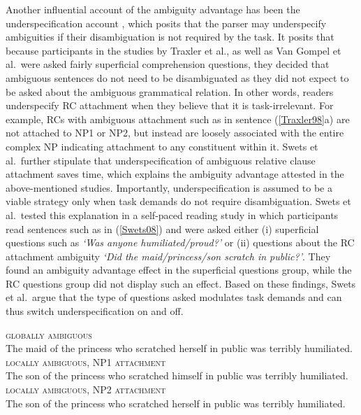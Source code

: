 \documentclass[english, doc]{apa7}\usepackage[]{graphicx}\usepackage[]{color}
\begin{document}
Another influential account of the ambiguity advantage has been the underspecification account \citep{SwetsEtAl:2008}, which posits that the parser may underspecify ambiguities if their disambiguation is not required by the task. It posits that because participants in the studies by Traxler et al., as well as Van Gompel et al.~were asked fairly superficial comprehension questions, they decided that ambiguous sentences do not need to be disambiguated as they did not expect to be asked about the ambiguous grammatical relation. In other words, readers underspecify RC attachment when they believe that it is task-irrelevant. For example, RCs with ambiguous attachment such as in sentence (\ref{Traxler98}a) are not attached to NP1 or NP2, but instead are loosely associated with the entire complex NP indicating attachment to any constituent within it.
Swets et al.~further stipulate that underspecification of ambiguous relative clause attachment saves time, which explains the ambiguity advantage attested in the above-mentioned studies. Importantly, underspecification is assumed to be a viable strategy only when task demands do not require disambiguation. Swets et al.~tested this explanation in a self-paced reading study in which participants read sentences such as in (\ref{Swets08}) and were asked either (i) superficial questions such as \emph{`Was anyone humiliated/proud?'} or (ii) questions about the RC attachment ambiguity \emph{`Did the maid/princess/son scratch in public?'}. They found an ambiguity advantage effect in the superficial questions group, while the RC questions group did not display such an effect. Based on these findings, Swets et al.~argue that the type of questions asked modulates task demands and can thus switch underspecification on and off.



\begin{exe}
    \ex \label{Swets08}
      \begin{xlist}
        \ex \textsc{globally ambiguous} \\ 
             The maid of the princess who scratched herself in public was terribly humiliated.
        \ex \textsc{locally ambiguous, NP1 attachment} \\ The son of the princess who scratched himself in public was terribly humiliated. 
        \ex \textsc{locally ambiguous, NP2 attachment} \\ The son of the princess who scratched herself in public was terribly humiliated.
        \end{xlist}
 \end{exe}
\end{document}

